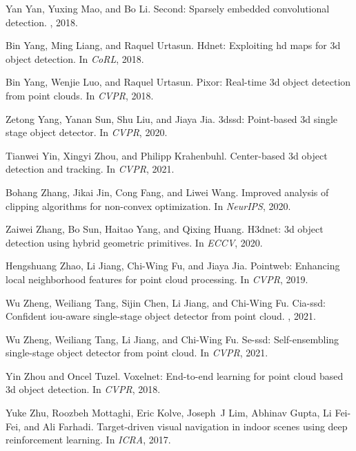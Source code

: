 \documentclass[final]{cvpr}
\begin{document}
{\begin{thebibliography}{10}
Yan Yan, Yuxing Mao, and Bo Li.
\newblock Second: Sparsely embedded convolutional detection.
, 2018.

Bin Yang, Ming Liang, and Raquel Urtasun.
\newblock Hdnet: Exploiting hd maps for 3d object detection.
\newblock In {\em CoRL}, 2018.

Bin Yang, Wenjie Luo, and Raquel Urtasun.
\newblock Pixor: Real-time 3d object detection from point clouds.
\newblock In {\em CVPR}, 2018.

Zetong Yang, Yanan Sun, Shu Liu, and Jiaya Jia.
\newblock 3dssd: Point-based 3d single stage object detector.
\newblock In {\em CVPR}, 2020.

Tianwei Yin, Xingyi Zhou, and Philipp Krahenbuhl.
\newblock Center-based 3d object detection and tracking.
\newblock In {\em CVPR}, 2021.

Bohang Zhang, Jikai Jin, Cong Fang, and Liwei Wang.
\newblock Improved analysis of clipping algorithms for non-convex optimization.
\newblock In {\em NeurIPS}, 2020.

Zaiwei Zhang, Bo Sun, Haitao Yang, and Qixing Huang.
\newblock H3dnet: 3d object detection using hybrid geometric primitives.
\newblock In {\em ECCV}, 2020.

Hengshuang Zhao, Li Jiang, Chi-Wing Fu, and Jiaya Jia.
\newblock Pointweb: Enhancing local neighborhood features for point cloud
  processing.
\newblock In {\em CVPR}, 2019.

Wu Zheng, Weiliang Tang, Sijin Chen, Li Jiang, and Chi-Wing Fu.
\newblock Cia-ssd: Confident iou-aware single-stage object detector from point
  cloud.
, 2021.

Wu Zheng, Weiliang Tang, Li Jiang, and Chi-Wing Fu.
\newblock Se-ssd: Self-ensembling single-stage object detector from point
  cloud.
\newblock In {\em CVPR}, 2021.

Yin Zhou and Oncel Tuzel.
\newblock Voxelnet: End-to-end learning for point cloud based 3d object
  detection.
\newblock In {\em CVPR}, 2018.

Yuke Zhu, Roozbeh Mottaghi, Eric Kolve, Joseph~J Lim, Abhinav Gupta, Li
  Fei-Fei, and Ali Farhadi.
\newblock Target-driven visual navigation in indoor scenes using deep
  reinforcement learning.
\newblock In {\em ICRA}, 2017.

\end{thebibliography}
 
}
\end{document}
